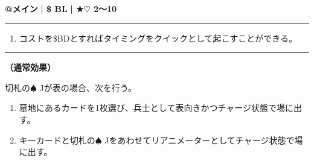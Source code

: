 \documentclass[twocolumn,a5paper,papersize,10pt]{jarticle}
\begin{document}
\begin{tcolorbox}[title={\small\bf【Action】リアニメーター召喚}{\scriptsize （召喚）}]

{\scriptsize\bf @メイン }
  {\scriptsize\bf | \$ BL }
  {\scriptsize\bf | ★{\normalsize $\heartsuit$} 2〜10}

\vspace{1mm} %
\hrule height 0.1mm depth 0mm width 62mm %
\vspace{1mm} %


\vspace{-1zh}%
\begin{enumerate}
\renewcommand{\labelenumi}{※}
\setlength{\leftskip}{-0.3cm}
\setlength{\itemsep}{0pt} %
\setlength{\parskip}{0pt} %

\item コストを\$BDとすればタイミングをクイックとして起こすことができる。

\vspace{-3mm}%
\end{enumerate}
\vspace{-2mm} %
\vspace{1zh}%
\vspace{1mm} %
\hrule height 0.1mm depth 0mm width 62mm %
\vspace{1mm} %

{\bf（通常効果）}

切札の{\normalsize $\spadesuit$} Jが表の場合、次を行う。


\vspace{-1zh}%
\begin{enumerate}
\setlength{\leftskip}{-0.3cm}
\setlength{\parskip}{0pt} %

\item 墓地にあるカードを1枚選び、兵士として表向きかつチャージ状態で場に出す。

\item キーカードと切札の{\normalsize $\spadesuit$} Jをあわせてリアニメーターとしてチャージ状態で場に出す。
\vspace{-1zh}%
\end{enumerate}

\vspace{1mm} %
\end{tcolorbox}
\end{document}
